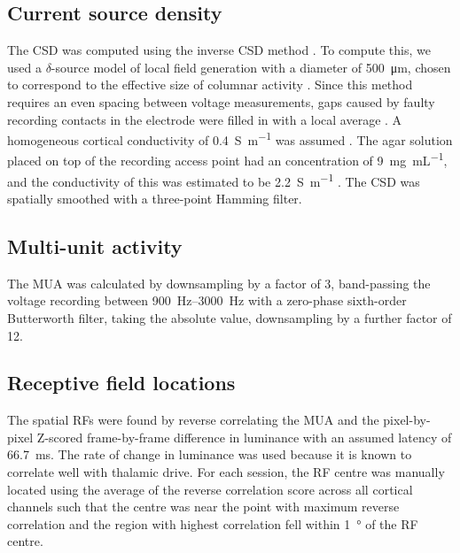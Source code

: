 \subsection{Current source density}
\label{sec:lam_csd}

The \ac{CSD} was computed using the inverse \ac{CSD} method \citep{Pettersen2006}.
To compute this, we used a $\delta$-source model of local field generation with a diameter of \SI{500}{\micro\metre}, chosen to correspond to the effective size of columnar activity \citep{Horton2005,Lund2003}.
Since this method requires an even spacing between voltage measurements, gaps caused by faulty recording contacts in the electrode were filled in with a local average \citep{Wojcik2010}.
A homogeneous cortical conductivity of \SI{0.4}{\siemens\per\metre} was assumed \citep{Logothetis2007}.
The agar solution placed on top of the recording access point had an  concentration of \SI{9}{\mg\per\mL}, and the conductivity of this was estimated to be \SI{2.2}{\siemens\per\metre} \citep{Kandadai2012}.
The \ac{CSD} was spatially smoothed with a three-point Hamming filter.


\subsection{Multi-unit activity}


The \ac{MUA} was calculated by downsampling by a factor of \num{3}, band-passing the voltage recording between \SIrange{900}{3000}{Hz} with a zero-phase sixth-order Butterworth filter, taking the absolute value, downsampling by a further factor of \num{12}.


\subsection{Receptive field locations}
\label{sec:lam_rf}

The spatial \acp{RF} were found by reverse correlating the \ac{MUA} and the pixel-by-pixel Z-scored frame-by-frame difference in luminance with an assumed latency of \SI{66.7}{\milli\second}.
The rate of change in luminance was used because it is known to correlate well with thalamic drive.
For each session, the \ac{RF} centre was manually located using the average of the reverse correlation score across all cortical channels such that the centre was near the point with maximum reverse correlation and the region with highest correlation fell within \SI{1}{\degree} of the \ac{RF} centre.


